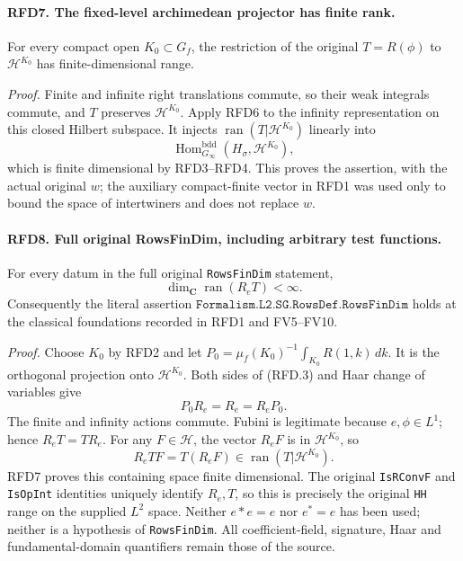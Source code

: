 \paragraph{RFD7. The fixed-level archimedean projector has finite rank.}
\label{claim:RFD7}
For every compact open \(K_0\subset G_f\), the restriction of the
original \(T=R(\phi)\) to \(\mathcal H^{K_0}\) has finite-dimensional
range.

\emph{Proof.}
Finite and infinite right translations commute, so their weak
integrals commute, and \(T\) preserves \(\mathcal H^{K_0}\).
Apply RFD6 to the infinity representation on this closed Hilbert
subspace.  It injects \(\operatorname{ran}(T|\mathcal H^{K_0})\)
linearly into
\[
 \operatorname{Hom}^{\mathrm{bdd}}_{G_\infty}
       (H_\sigma,\mathcal H^{K_0}),
\]
which is finite dimensional by RFD3--RFD4.  This proves the
assertion, with the actual original \(w\); the auxiliary
compact-finite vector in RFD1 was used only to bound the space
of intertwiners and does not replace \(w\).

\paragraph{RFD8. Full original RowsFinDim, including arbitrary test functions.}
\label{claim:RFD8}
For every datum in the full original \texttt{RowsFinDim} statement,
\[
 \dim_{\mathbf C}\operatorname{ran}(R_eT)<\infty.
 \tag{RFD.12}
\]
Consequently the literal assertion
\(\texttt{Formalism.L2.SG.RowsDef.RowsFinDim}\) holds at the
classical foundations recorded in RFD1 and FV5--FV10.

\emph{Proof.}
Choose \(K_0\) by RFD2 and let
\(P_0=\mu_f(K_0)^{-1}\int_{K_0}R(1,k)\,dk\).
It is the orthogonal projection onto \(\mathcal H^{K_0}\).
Both sides of (RFD.3) and Haar change of variables give
\[
                 P_0R_e=R_e=R_eP_0.
 \tag{RFD.13}
\]
The finite and infinity actions commute.  Fubini is legitimate
because \(e,\phi\in L^1\); hence \(R_eT=TR_e\).
For any \(F\in\mathcal H\), the vector \(R_eF\) is in
\(\mathcal H^{K_0}\), so
\[
 R_eTF=T(R_eF)\in\operatorname{ran}(T|\mathcal H^{K_0}).
\]
RFD7 proves this containing space finite dimensional.  The
original \texttt{IsRConvF} and \texttt{IsOpInt} identities
uniquely identify \(R_e,T\), so this is precisely the original
\texttt{HH} range on the supplied \(L^2\) space.  Neither
\(e*e=e\) nor \(e^*=e\) has been used; neither is a hypothesis
of \texttt{RowsFinDim}.  All coefficient-field, signature, Haar
and fundamental-domain quantifiers remain those of the source.

